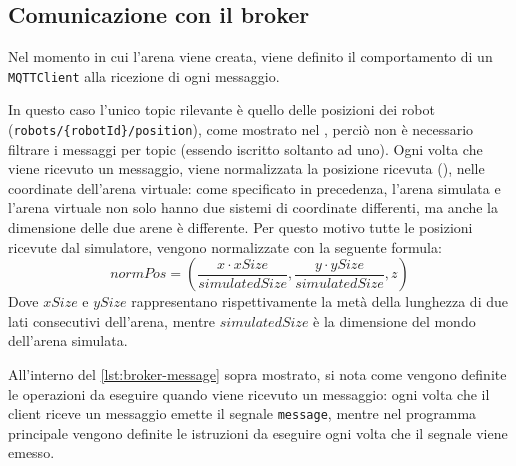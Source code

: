 \documentclass[12pt,a4paper,openright,oneside]{book}
\begin{document}
\subsection{Comunicazione con il broker}\label{sub:impl_comunicazione_con_il_broker} %
Nel momento in cui l'arena viene creata, viene definito il comportamento di un \texttt{MQTTClient} alla ricezione di ogni messaggio.

In questo caso l'unico topic rilevante è quello delle posizioni dei robot (\texttt{robots/\{robotId\}/position}), come mostrato nel , perciò non è necessario filtrare i messaggi per topic (essendo iscritto soltanto ad uno).
Ogni volta che viene ricevuto un messaggio, viene normalizzata la posizione ricevuta (), nelle coordinate dell'arena virtuale: come specificato in precedenza, l'arena simulata e l'arena virtuale non solo hanno due sistemi di coordinate differenti, ma anche la dimensione delle due arene è differente.
Per questo motivo tutte le posizioni ricevute dal simulatore, vengono normalizzate con la seguente formula:
$$
    normPos = \left( \frac{x \cdot xSize}{simulatedSize}, \frac{y \cdot ySize}{simulatedSize}, z\right)
$$
Dove $xSize$ e $ySize$ rappresentano rispettivamente la metà della lunghezza di due lati consecutivi dell'arena, mentre $simulatedSize$ è la dimensione del mondo dell'arena simulata.
%

All'interno del \cref{lst:broker-message} sopra mostrato, si nota come vengono definite le operazioni da eseguire quando viene ricevuto un messaggio: ogni volta che il client riceve un messaggio emette il segnale \texttt{message}, mentre nel programma principale vengono definite le istruzioni da eseguire ogni volta che il segnale viene emesso.
%
%
\end{document}
